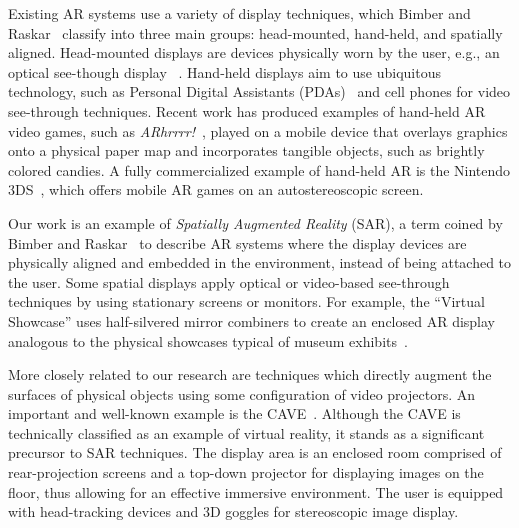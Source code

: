 \documentclass[review]{vgtc}                 %
\begin{document}
Existing AR systems use a variety of display techniques, which Bimber
and Raskar~\cite{BimberBook} classify into three main groups:
head-mounted, hand-held, and spatially aligned.  Head-mounted displays
are devices physically worn by the user, e.g.,
an optical see-though display~\cite{Sutherland1968} .  Hand-held
displays aim to use ubiquitous technology, such as Personal Digital
Assistants (PDAs)~\cite{Pasman2003, Wagner2003} and cell phones for
video see-through techniques.  Recent work has produced examples of
hand-held AR video games, such as \emph{ARhrrrr!}~\cite{ARhrrrr!},
played on a mobile device that overlays graphics onto a physical paper
map and incorporates tangible objects, such as brightly colored
candies.  A fully commercialized example of hand-held AR is the
Nintendo 3DS~\cite{Nintendo3DS}, which offers mobile AR games on an
autostereoscopic screen.


Our work is an example of \emph{Spatially Augmented Reality} (SAR), a
term coined by Bimber and Raskar~\cite{BimberBook} to describe AR
systems where the display devices are physically aligned and embedded
in the environment, instead of being attached to the user.  Some
spatial displays apply optical or video-based see-through techniques
by using stationary screens or monitors. For example,
the ``Virtual Showcase'' uses half-silvered mirror combiners to create
an enclosed AR display analogous to the physical showcases typical of
museum exhibits~\cite{Bimber2005}.

More closely related to our research are techniques which directly
augment the surfaces of physical objects using some configuration of
video projectors. An important and well-known example is the 
CAVE~\cite{Cruz-Neira1993}.  Although the CAVE is technically
classified as an example of virtual reality, it stands as a
significant precursor to SAR techniques.  The display area is an
enclosed room comprised of rear-projection screens and a top-down
projector for displaying images on the floor, thus allowing for an
effective immersive environment.  The user is equipped with
head-tracking devices and 3D goggles for stereoscopic image display.
\end{document}
